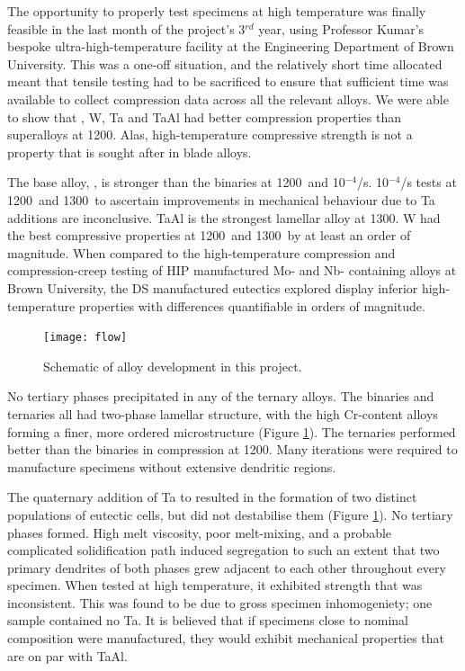 The opportunity to properly test specimens at high temperature was finally feasible in the last month of the project's 3$^{rd}$ year, using Professor Kumar's bespoke ultra-high-temperature facility at the Engineering Department of Brown University.  This was a one-off situation, and the relatively short time allocated meant that tensile testing had to be sacrificed to ensure that sufficient time was available to collect compression data across all the relevant alloys.  We were able to show that , W, Ta and TaAl had better compression properties than superalloys at 1200\celsius.  Alas, high-temperature compressive strength is not a property that is sought after in blade alloys.

The base alloy, , is stronger than the binaries at 1200\celsius\ and 10$^{-4}$/s.  10$^{-4}$/s tests at 1200\celsius\ and 1300\celsius\ to ascertain improvements in mechanical behaviour due to Ta additions are inconclusive.  TaAl is the strongest lamellar alloy at 1300\celsius.  W had the best compressive properties at 1200\celsius\ and 1300\celsius\ by at least an order of magnitude.  When compared to the high-temperature compression and compression-creep testing of HIP manufactured Mo- and Nb- containing alloys at Brown University, the DS manufactured eutectics explored display inferior high-temperature properties with differences quantifiable in orders of magnitude.

%
\begin{figure}[H]
\begin{center}
\texttt{[image: flow]}
\caption{Schematic of alloy development in this project.}
\label{fig:flow}
\end{center}
\end{figure}
%

No tertiary phases precipitated in any of the ternary alloys.  The binaries and ternaries all had two-phase lamellar structure, with the high Cr-content alloys forming a finer, more ordered microstructure (Figure \ref{fig:flow}).  The ternaries performed better than the binaries in compression at 1200\celsius.  Many iterations were required to manufacture specimens without extensive dendritic regions.

The quaternary addition of Ta to  resulted in the formation of two distinct populations of eutectic cells, but did not destabilise them (Figure \ref{fig:flow}). No tertiary phases formed.  High melt viscosity, poor melt-mixing, and a probable complicated solidification path induced segregation to such an extent that two primary dendrites of both phases grew adjacent to each other throughout every specimen.  When tested at high temperature, it exhibited strength that was inconsistent.  This was found to be due to gross specimen inhomogeniety; one sample contained no Ta.  It is believed that if specimens close to nominal composition were manufactured, they would exhibit mechanical properties that are on par with TaAl.
 
